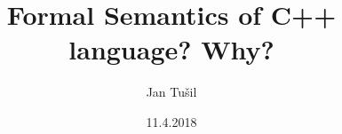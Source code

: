 \documentclass[11pt]{beamer}
\author{Jan Tušil}
\title{Formal Semantics of C++ language? Why?}
\institute{FI MU}
\date{11.4.2018}
\begin{document}


\begin{frame}
\titlepage
\end{frame}


\end{document}
